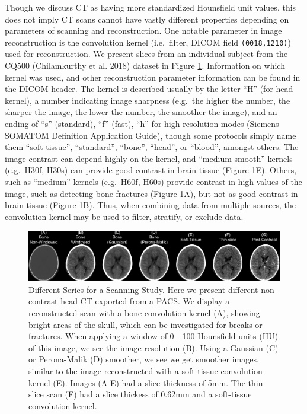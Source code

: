 \documentclass[]{elsarticle} %
\begin{document}
Though we discuss CT as having more standardized Hounsfield unit values, this does not imply CT scans cannot have vastly different properties depending on parameters of scanning and reconstruction. One notable parameter in image reconstruction is the convolution kernel (i.e.~filter, DICOM field \texttt{(0018,1210)}) used for reconstruction. We present slices from an individual subject from the CQ500 (Chilamkurthy et al. 2018) dataset in Figure \ref{fig:overlay}. Information on which kernel was used, and other reconstruction parameter information can be found in the DICOM header. The kernel is described usually by the letter ``H'' (for head kernel), a number indicating image sharpness (e.g.~the higher the number, the sharper the image, the lower the number, the smoother the image), and an ending of ``s'' (standard), ``f'' (fast), ``h'' for high resolution modes (Siemens SOMATOM Definition Application Guide),
though some protocols simply name them ``soft-tissue'', ``standard'', ``bone'', ``head'', or ``blood'', amongst others. The image contrast can depend highly on the kernel, and ``medium smooth'' kernels (e.g.~H30f, H30s) can provide good contrast in brain tissue (Figure \ref{fig:overlay}E). Others, such as ``medium'' kernels (e.g.~H60f, H60s) provide contrast in high values of the image, such as detecting bone fractures (Figure \ref{fig:overlay}A), but not as good contrast in brain tissue (Figure \ref{fig:overlay}B). Thus, when combining data from multiple sources, the convolution kernel may be used to filter, stratify, or exclude data.

\begin{figure}
\includegraphics[width=1\linewidth]{overlaid_slices} \caption{Different Series for a Scanning Study.  Here we present different non-contrast head CT exported from a PACS.  We display a reconstructed scan with a bone convolution kernel (A), showing bright areas of the skull, which can be investigated for breaks or fractures.  When applying a window of 0 - 100 Hounsfield units (HU) of this image, we see the image resolution (B).  Using a Gaussian (C) or Perona-Malik (D) smoother, we see we get smoother images, similar to the image reconstructed with a soft-tissue convolution kernel (E).  Images (A-E) had a slice thickness of 5mm.  The thin-slice scan (F) had a slice thickess of 0.62mm and a soft-tissue convolution kernel.}\label{fig:overlay}
\end{figure}
\end{document}
